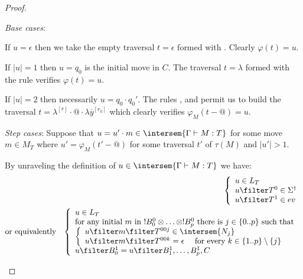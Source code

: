 \begin{proof}
\begin{enumerate}[$\bullet$]
\begin{enumerate}
    \emph{Base cases}:
    \begin{compactitem}[-]
    \item If $u=\epsilon$ then we take the empty traversal $t=\epsilon$ formed
with . Clearly $\varphi(t) = u$.
    \item If $|u|=1$ then $u=q_0$ is the initial move in $C$. The traversal $t=\lambda$ formed with the rule  verifies $\varphi(t) = u$.
    \item If $|u|=2$ then necessarily $u = q_0 \cdot q_0'$. The rules , 
and  permit us to build the traversal $t = \lambda^{[r]} \cdot @ \cdot \lambda \overline{y}^{[r_0]}$ which clearly verifies $\varphi_M(t-@) = u$.
    \end{compactitem}

    \emph{Step cases}: Suppose that $u = u' \cdot m \in \intersem{\Gamma \vdash M : T}$
    for some move $m \in M_T$ where
    $u' = \varphi_M(t'-@)$ for some traversal $t'$ of $\tau(M)$
    and $|u'|>1$.

    By unraveling the definition of $u \in \intersem{\Gamma \vdash M : T}$ we have:
    \begin{eqnarray*}
      &&      \left\{
            \begin{array}{ll}
                u \in L_T\\
                u \filter T^0  \in \Sigma^\dagger \\
                u \filter T^1  \in  ev
            \end{array}
            \right. \\
    & \mbox{or equivalently} & \left\{
    \begin{array}{ll}
        u \in L_T \\
        \hbox{for any initial $m$ in $!B_0^0 \otimes \ldots \otimes !B_p^0$ there is $j \in \{0..p\}$ such that } \\
        \left\{\begin{array}{ll}
            u \filter m \filter T^{00j} \in \intersem{N_j} \label{eq:def_z} \\
            u \filter m \filter T^{00k} = \epsilon \quad \mbox{ for every } k\in \{1..p\}\setminus\{j\} \label{eq:b}
        \end{array}
        \right. \\
        u \filter B^1_0 = u \filter B^1_1, \ldots, B^1_p, C
    \end{array}
    \right.
    \end{eqnarray*}


\end{enumerate}
\end{enumerate}
\end{proof}
